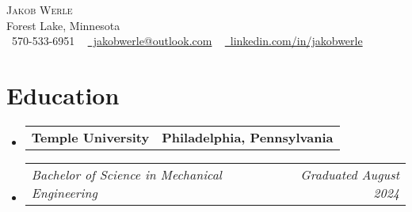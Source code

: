 \documentclass[letterpaper,11pt]{article}
\makeatletter
\newcommand{\company}[2]{
  \vspace{-2pt}\item
  \begin{tabular*}{1.0\textwidth}[t]{l@{\extracolsep{\fill}}r}
    \textbf{#1} & \textbf{\small #2} \\
  \end{tabular*}\vspace{-18pt}
}
\newcommand{\role}[2]{
  \vspace{-5pt}\item
  \begin{tabular*}{1.0\textwidth}[t]{l@{\extracolsep{\fill}}r}
    \textit{\small#1} & \textit{\small #2} \\
  \end{tabular*}\vspace{-20pt}
}
\newcommand{\companyListStart}{
  \begin{itemize}[leftmargin=0.0in, label={}]
}
\newcommand{\companyListEnd}{
  \end{itemize}
}
\makeatother
\begin{document}
\begin{center}
    {\Huge \scshape Jakob Werle} \\ \vspace{1pt}
    Forest Lake, Minnesota \\ \vspace{1pt}
    \small \raisebox{-0.1\height}\faPhone\ 570-533-6951 ~ \href{mailto:jakobwerle@outlook.com}{\raisebox{-0.2\height}\faEnvelope\ jakobwerle@outlook.com} ~ 
    \href{https://linkedin.com/in/jakobwerle}{\raisebox{-0.2\height}\faLinkedin\ linkedin.com/in/jakobwerle}
    \vspace{-8pt}
\end{center}

\section{Education}
  \companyListStart
    \company{Temple University}{Philadelphia, Pennsylvania}
      \role{Bachelor of Science in Mechanical Engineering}{Graduated August 2024}
  \companyListEnd
\vspace{-12pt}

\end{document}
